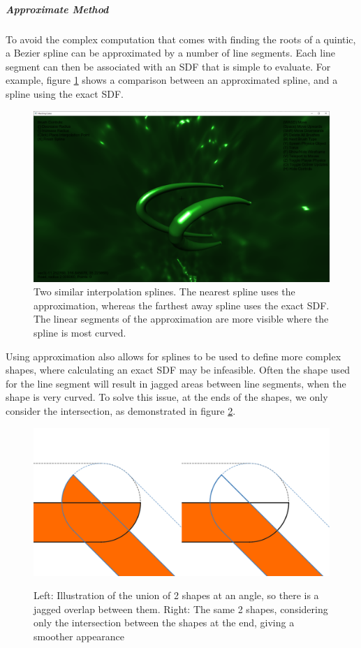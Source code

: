 \documentclass[11pt]{article}
\begin{document}
\subparagraph{Approximate Method}
To avoid the complex computation that comes with finding the roots of a quintic, a Bezier spline can be approximated by a number of line segments. Each line segment can then be associated with an SDF that is simple to evaluate. For example, figure \ref{fig:spline_approximation} shows a comparison between an approximated spline, and a spline using the exact SDF.
\begin{figure}[H]
  \includegraphics[width=\textwidth]{spline_approximation_2.png}
  \caption{Two similar interpolation splines. The nearest spline uses the approximation, whereas the farthest away spline uses the exact SDF. The linear segments of the approximation are more visible where the spline is most curved.}
  \label{fig:spline_approximation}
\end{figure}

Using approximation also allows for splines to be used to define more complex shapes, where calculating an exact SDF may be infeasible. Often the shape used for the line segment will result in jagged areas between line segments, when the shape is very curved. To solve this issue, at the ends of the shapes, we only consider the intersection, as demonstrated in figure \ref{fig:road_double}.

\begin{figure}[H]
  \caption{Left: Illustration of the union of 2 shapes at an angle, so there is a jagged overlap between them. Right: The same 2 shapes, considering only the intersection between the shapes at the end, giving a smoother appearance}
  \includegraphics[width=\textwidth]{road_double.png}
  \label{fig:road_double}
\end{figure}
\end{document}

